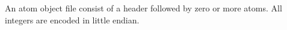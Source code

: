 An atom object file consist of a header followed by zero or more atoms.
All integers are encoded in little endian.
